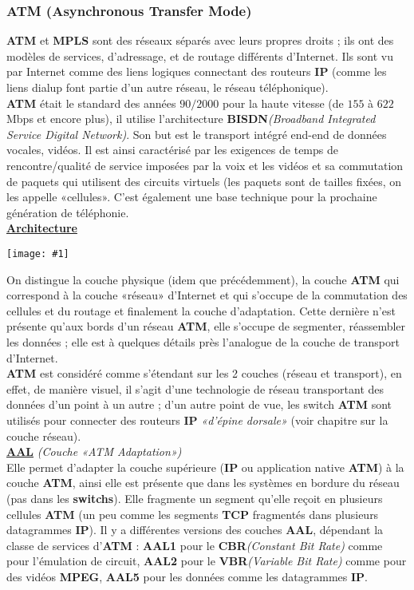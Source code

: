 \documentclass{article}
\newcommand{\imgR}[2]{\begin{center}\texttt{[image: \#1]}\end{center}}
\newcommand{\stitre}[1]{\noindent\textbf{\underline{#1}} \\}
\newcommand{\stitreD}[2]{\noindent\textbf{\underline{#1}} \textit{(#2)}\\}
\begin{document}
\subsubsection{ATM (Asynchronous Transfer Mode)}

\textbf{ATM} et \textbf{MPLS} sont des réseaux séparés avec leurs propres droits ; ils ont des modèles de 
services, d'adressage, et de routage différents d'Internet. Ils sont vu par Internet comme des liens logiques 
connectant des routeurs \textbf{IP} (comme les liens dialup font partie d'un autre réseau, le réseau 
téléphonique). \\

\textbf{ATM} était le standard des années $90/2000$ pour la haute vitesse (de $155$ à $622$ Mbps et encore plus), 
il utilise l'architecture \textbf{BISDN}\textit{(Broadband Integrated Service Digital Network)}. Son but est le 
transport intégré end-end de données vocales, vidéos. Il est ainsi caractérisé par les exigences de temps de 
rencontre/qualité de service imposées par la voix et les vidéos et sa commutation de paquets qui utilisent des 
circuits virtuels (les paquets sont de tailles fixées, on les appelle «cellules». C'est également une base 
technique pour la prochaine génération de téléphonie. \\

\stitre{Architecture}

\imgR{CN_131.png}{200}

On distingue la couche physique (idem que précédemment), la couche \textbf{ATM} qui correspond à la couche 
«réseau» d'Internet et qui s'occupe de la commutation des cellules et du routage et finalement la couche 
d'adaptation. Cette dernière n'est présente qu'aux bords d'un réseau \textbf{ATM}, elle s'occupe de segmenter, 
réassembler les données ; elle est à quelques détails près l'analogue de la couche de transport d'Internet. \\

\noindent \textbf{ATM} est considéré comme s'étendant sur les 2 couches (réseau et transport), en effet, de 
manière visuel, il s'agit d'une technologie de réseau transportant des données d'un point à un autre ; d'un autre 
point de vue, les switch \textbf{ATM} sont utilisés pour connecter des routeurs \textbf{IP} \textit{«d'épine 
dorsale»} (voir chapitre sur la couche réseau). \\

\stitreD{AAL}{Couche «ATM Adaptation»}

Elle permet d'adapter la couche supérieure (\textbf{IP} ou application native \textbf{ATM}) à la couche 
\textbf{ATM}, ainsi elle est présente que dans les systèmes en bordure du réseau (pas dans les \textbf{switchs}).
Elle fragmente un segment qu'elle reçoit en plusieurs cellules \textbf{ATM} (un peu comme les segments 
\textbf{TCP} fragmentés dans plusieurs datagrammes \textbf{IP}). Il y a différentes versions des couches 
\textbf{AAL}, dépendant la classe de services d'\textbf{ATM} : \textbf{AAL1} pour le 
\textbf{CBR}\textit{(Constant Bit Rate)} comme pour l'émulation de circuit, \textbf{AAL2} pour le 
\textbf{VBR}\textit{(Variable Bit Rate)} comme pour des vidéos \textbf{MPEG}, \textbf{AAL5} pour les données 
comme les datagrammes \textbf{IP}. \\
\end{document}
